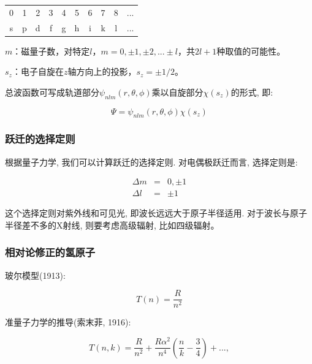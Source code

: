 \begin{center}

\begin{tabular}{|c|c|c|c|c|c|c|c|c|c|}
  \hline
  0 & 1 & 2 & 3 & 4 & 5 & 6 & 7 & 8 & ... \\
  s & p & d & f & g & h & i & k & l & ... \\
  \hline
\end{tabular}

\end{center}

$m$：磁量子数，对特定$l$，$m = 0,\pm 1, \pm 2,...\pm
l$，共$2l+1$种取值的可能性。

$s_z$：电子自旋在$z$轴方向上的投影，$s_z=\pm 1/2$。

总波函数可写成轨道部分$\psi_{nlm}(r,\theta,\phi)$乘以自旋部分$\chi(s_z)$的形式,
即:

\begin{equation*}
\Psi = \psi_{nlm}(r,\theta,\phi)\chi(s_z)
\end{equation*}


\subsubsection{跃迁的选择定则}

根据量子力学, 我们可以计算跃迁的选择定则. 对电偶极跃迁而言,
选择定则是:


\begin{eqnarray}
  \Delta m &=& 0, \pm 1 \\
  \Delta l &=& \pm 1
\end{eqnarray}


这个选择定则对紫外线和可见光, 即波长远远大于原子半径适用.
对于波长与原子半径差不多的X射线, 则要考虑高级辐射, 比如四级辐射。

\subsubsection{相对论修正的氢原子}

玻尔模型(1913):

\begin{equation*}
T(n) = \frac{R}{n^2}
\end{equation*}


准量子力学的推导(索末菲, 1916):

\begin{equation*}
T(n,k)=\frac{R}{n^2}+\frac{R\alpha^2}{n^4}\left(
\frac{n}{k}-\frac{3}{4}\right)+...,
\end{equation*}

